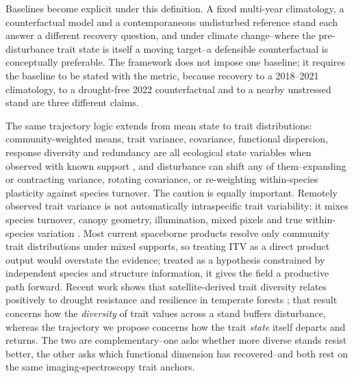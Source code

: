 \documentclass[pdflatex,sn-mathphys-num]{sn-jnl}
\begin{document}
Baselines become explicit under this definition. A fixed multi-year climatology, a counterfactual model and a contemporaneous undisturbed reference stand each answer a different recovery question, and under climate change--where the pre-disturbance trait state is itself a moving target--a defensible counterfactual is conceptually preferable. The framework does not impose one baseline; it requires the baseline to be stated with the metric, because recovery to a 2018--2021 climatology, to a drought-free 2022 counterfactual and to a nearby unstressed stand are three different claims.

The same trajectory logic extends from mean state to trait distributions: community-weighted means, trait variance, covariance, functional dispersion, response diversity and redundancy are all ecological state variables when observed with known support \cite{mason2005functional,laliberte2010fdis,mori2013response,oliver2015biodiversity,pillar2013functional}, and disturbance can shift any of them--expanding or contracting variance, rotating covariance, or re-weighting within-species plasticity against species turnover. The caution is equally important. Remotely observed trait variance is not automatically intraspecific trait variability: it mixes species turnover, canopy geometry, illumination, mixed pixels and true within-species variation \cite{violle2012returnfunctional,Violle2007,albert2010multitrait}. Most current spaceborne products resolve only community trait distributions under mixed supports, so treating ITV as a direct product output would overstate the evidence; treated as a hypothesis constrained by independent species and structure information, it gives the field a productive path forward. Recent work shows that satellite-derived trait diversity relates positively to drought resistance and resilience in temperate forests \cite{helfenstein2025satellite}; that result concerns how the \textit{diversity} of trait values across a stand buffers disturbance, whereas the trajectory we propose concerns how the trait \textit{state} itself departs and returns. The two are complementary--one asks whether more diverse stands resist better, the other asks which functional dimension has recovered--and both rest on the same imaging-spectroscopy trait anchors.
\end{document}
